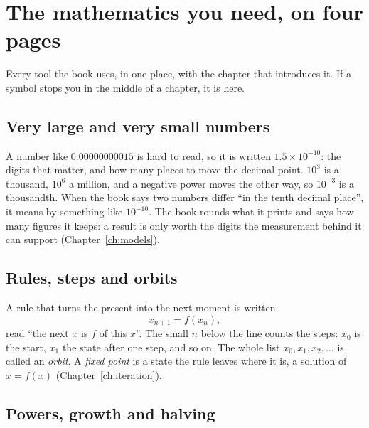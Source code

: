
\chapter{The mathematics you need, on four pages}
\label{app:toolkit}

\noindent
Every tool the book uses, in one place, with the chapter that introduces it.
If a symbol stops you in the middle of a chapter, it is here.

\section{Very large and very small numbers}
\label{sec:appc-numbers}

\noindent
A number like $\num{0.00000000015}$ is hard to read, so it is written
$\num{1.5} \times 10^{-10}$: the digits that matter, and how many places to
move the decimal point. $10^{3}$ is a thousand, $10^{6}$ a million, and a
negative power moves the other way, so $10^{-3}$ is a thousandth. When the
book says two numbers differ \enquote{in the tenth decimal place}, it means
by something like $10^{-10}$. The book rounds what it prints and says how
many figures it keeps: a result is only worth the digits the measurement
behind it can support (Chapter~\ref{ch:models}).

\section{Rules, steps and orbits}
\label{sec:appc-steps}

\noindent
A rule that turns the present into the next moment is written
\[ x_{n+1} = f(x_{n}), \]
read \enquote{the next $x$ is $f$ of this $x$}. The small $n$ below the line
counts the steps: $x_{0}$ is the start, $x_{1}$ the state after one step, and
so on. The whole list $x_{0}, x_{1}, x_{2}, \ldots$ is called an
\emph{orbit}. A \emph{fixed point} is a state the rule leaves where it is,
a solution of $x = f(x)$ (Chapter~\ref{ch:iteration}).

\section{Powers, growth and halving}
\label{sec:appc-powers}

